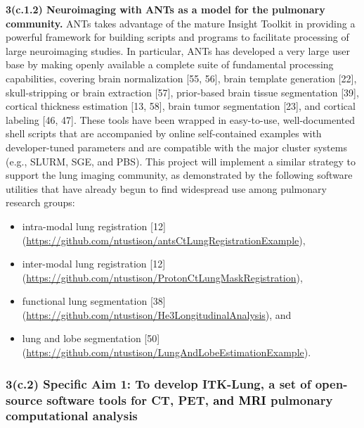 \documentclass[11pt,]{article}
\providecommand{\tightlist}{%
  \setlength{\itemsep}{0pt}\setlength{\parskip}{0pt}}
\begin{document}
\textbf{3(c.1.2) Neuroimaging with ANTs as a model for the pulmonary
community.} ANTs takes advantage of the mature Insight Toolkit in
providing a powerful framework for building scripts and programs to
facilitate processing of large neuroimaging studies. In particular, ANTs
has developed a very large user base by making openly available a
complete suite of fundamental processing capabilities, covering brain
normalization {[}55, 56{]}, brain template generation {[}22{]},
skull-stripping or brain extraction {[}57{]}, prior-based brain tissue
segmentation {[}39{]}, cortical thickness estimation {[}13, 58{]}, brain
tumor segmentation {[}23{]}, and cortical labeling {[}46, 47{]}. These
tools have been wrapped in easy-to-use, well-documented shell scripts
that are accompanied by online self-contained examples with
developer-tuned parameters and are compatible with the major cluster
systems (e.g., SLURM, SGE, and PBS). This project will implement a
similar strategy to support the lung imaging community, as demonstrated
by the following software utilities that have already begun to find
widespread use among pulmonary research groups:

\begin{itemize}
\tightlist
\item
  intra-modal lung registration {[}12{]}
  (\url{https://github.com/ntustison/antsCtLungRegistrationExample}),
\item
  inter-modal lung registration {[}12{]}
  (\url{https://github.com/ntustison/ProtonCtLungMaskRegistration}),
\item
  functional lung segmentation {[}38{]}
  (\url{https://github.com/ntustison/He3LongitudinalAnalysis}), and
\item
  lung and lobe segmentation {[}50{]}
  (\url{https://github.com/ntustison/LungAndLobeEstimationExample}).
\end{itemize}

\subsubsection{\texorpdfstring{3(c.2) \textbf{Specific Aim 1:} To
develop ITK-Lung, a set of open-source software tools for CT, PET,
\textcolor{black}{and MRI} pulmonary computational
analysis}{3(c.2) Specific Aim 1: To develop ITK-Lung, a set of open-source software tools for CT, PET,  pulmonary computational analysis}}\label{c.2-specific-aim-1-to-develop-itk-lung-a-set-of-open-source-software-tools-for-ct-pet-pulmonary-computational-analysis}
\end{document}
